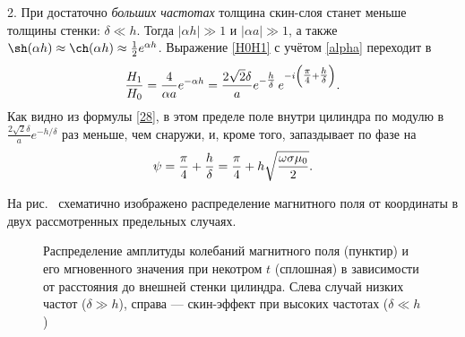 2. При достаточно \emph{больших частотах} толщина скин-слоя станет меньше толщины стенки:
$\delta \ll h$. Тогда $|\alpha h| \gg 1$ и $|\alpha a| \gg 1$, а
также $\sh(\alpha h)\approx\ch(\alpha h)\approx\frac12e^{\alpha h}$.
Выражение \eqref{H0H1} с учётом \eqref{alpha} переходит в
\begin{equation} \eqmark{28}
\frac{H_1}{H_0}= \frac{4}{\alpha a} e^{-\alpha h}
= \frac{2\sqrt{2}\delta}{a}e^{-\tfrac{h}{\delta}}\,e^{-i\left(\tfrac{\pi}{4}+\tfrac{h}{\delta}\right)}.
\end{equation}
Как видно из формулы \eqref{28}, в этом пределе поле внутри цилиндра по модулю в
$\frac{2\sqrt{2}\delta}{a}e^{-h/\delta}$ раз меньше, чем снаружи, и,
кроме того, запаздывает по фазе на
\begin{equation} \eqmark{29}
\psi=\frac{\pi}{4}+\frac{h}{\delta}=
\frac{\pi}{4}+h\sqrt{\frac{\omega\sigma\mu_0}{2}}.
\end{equation}

На рис.~ схематично изображено распределение магнитного 
поля от координаты в двух рассмотренных предельных случаях.

\begin{figure}
    \centering
    \par
    \caption{Распределение амплитуды колебаний магнитного поля (пунктир)
        и его мгновенного значения при некотром $t$ (сплошная) в зависимости 
        от расстояния до внешней стенки цилиндра. 
        Слева случай низких частот ($\delta \gg h$), справа --- скин-эффект
        при высоких частотах ($\delta \ll h$)}
\end{figure}





